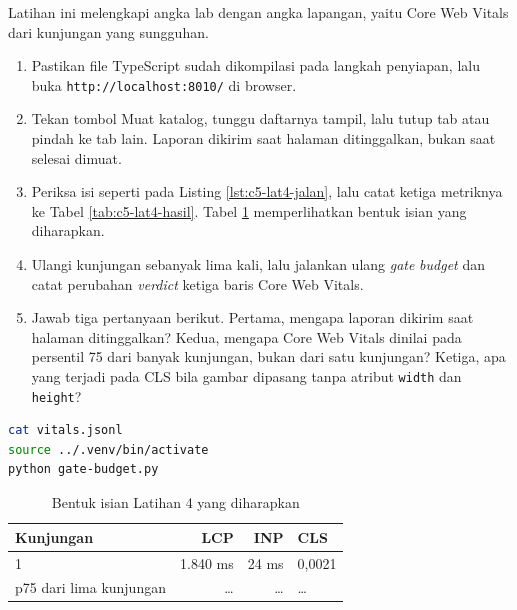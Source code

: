 Latihan ini melengkapi angka lab dengan angka lapangan, yaitu Core Web Vitals
dari kunjungan yang sungguhan.

\begin{enumerate}
  \item Pastikan file TypeScript sudah dikompilasi pada langkah penyiapan,
        lalu buka \texttt{http://localhost:8010/} di browser.
  \item Tekan tombol Muat katalog, tunggu daftarnya tampil, lalu tutup tab
        atau pindah ke tab lain. Laporan dikirim saat halaman ditinggalkan,
        bukan saat selesai dimuat.
  \item Periksa isi  seperti pada
        Listing \ref{lst:c5-lat4-jalan}, lalu catat ketiga metriknya ke Tabel \ref{tab:c5-lat4-hasil}. Tabel \ref{tab:c5-lat4-contoh}
        memperlihatkan bentuk isian yang diharapkan.
  \item Ulangi kunjungan sebanyak lima kali, lalu jalankan ulang \textit{gate}
        \textit{budget} dan catat perubahan \textit{verdict} ketiga baris Core Web Vitals.
  \item Jawab tiga pertanyaan berikut. Pertama, mengapa laporan dikirim saat
        halaman ditinggalkan? Kedua, mengapa Core Web Vitals dinilai pada
        persentil 75 dari banyak kunjungan, bukan dari satu kunjungan?
        Ketiga, apa yang terjadi pada CLS bila gambar dipasang tanpa atribut
        \texttt{width} dan \texttt{height}?
\end{enumerate}

\begin{lstlisting}[language=bash, caption={Memeriksa laporan Core Web Vitals yang masuk, dihasilkan \berkas{sources/chapter05/web-vitals.ts}}, label={lst:c5-lat4-jalan}]
cat vitals.jsonl
source ../.venv/bin/activate
python gate-budget.py
\end{lstlisting}

\begin{table}[!htb]
  \centering
  \caption{Bentuk isian Latihan 4 yang diharapkan}
  \label{tab:c5-lat4-contoh}
  \begin{tabularx}{\textwidth}{lrrX}
    \hline
    \textbf{Kunjungan} & \textbf{LCP} & \textbf{INP} & \textbf{CLS} \\
    \hline
    1 & 1.840 ms & 24 ms & 0,0021 \\
    \hline
    p75 dari lima kunjungan & \dots & \dots & \dots \\
    \hline
  \end{tabularx}
\end{table}

